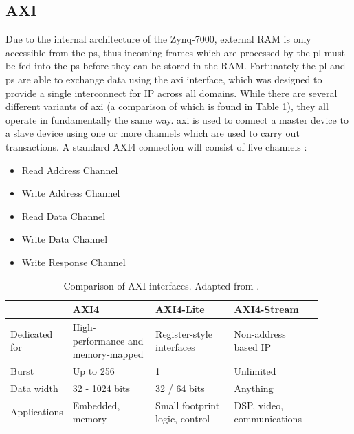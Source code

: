 \subsection{AXI}
Due to the internal architecture of the Zynq-7000, external RAM is only accessible from the \gls{ps}, thus incoming frames which are processed by the \gls{pl} must be fed into the \gls{ps} before they can be stored in the RAM. Fortunately the \gls{pl} and \gls{ps} are able to exchange data using the \gls{axi} interface, which was designed to provide a single interconnect for IP across all domains. While there are several different variants of \gls{axi} (a comparison of which is found in Table \ref{table:axi_comparison}), they all operate in fundamentally the same way. \gls{axi} is used to connect a master device to a slave device using one or more channels which are used to carry out transactions. A standard AXI4 connection will consist of five channels \cite{xilinx:ug1037}:
\begin{itemize}
  \item Read Address Channel
  \item Write Address Channel
  \item Read Data Channel
  \item Write Data Channel
  \item Write Response Channel
\end{itemize}

\begin{table}
\centering
\begin{tabular}{l|p{0.3\linewidth}p{0.3\linewidth}p{0.3\linewidth}}
              & AXI4                               & AXI4-Lite                      & AXI4-Stream                \\
\hline
Dedicated for & High-performance and memory-mapped & Register-style interfaces      & Non-address based IP       \\
Burst         & Up to 256                          & 1                              & Unlimited                  \\
Data width    & 32 - 1024 bits                     & 32 / 64 bits                   & Anything                   \\
Applications  & Embedded, memory                   & Small footprint logic, control & DSP, video, communications
\end{tabular}
\caption{Comparison of AXI interfaces. Adapted from \cite{xilinx:ug1037}.}
\label{table:axi_comparison}
\end{table}

